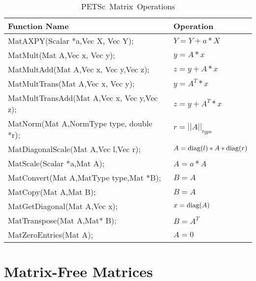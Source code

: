 \begin{table}[H]
\begin{center}
\begin{tabular}{ll}
{\bf Function Name} & {\bf Operation} \\
\hline
MatAXPY(Scalar *a,Vec X, Vec Y); & $ Y = Y + a*X $ \\
MatMult(Mat A,Vec x, Vec y); & $ y = A*x $ \\
MatMultAdd(Mat A,Vec x, Vec y,Vec z); & $ z = y + A*x $ \\
MatMultTrans(Mat A,Vec x, Vec y); & $ y = A^{T}*x $ \\
MatMultTransAdd(Mat A,Vec x, Vec y,Vec z); & $ z = y + A^{T}*x $ \\
MatNorm(Mat A,NormType type,  double *r); & $ r = ||A||_{type}$ \\
MatDiagonalScale(Mat A,Vec l,Vec r); & $ A = \hbox{diag}(l)*A*\hbox{diag}(r) $ \\
MatScale(Scalar *a,Mat A); & $ A = a*A $ \\
MatConvert(Mat A,MatType type,Mat *B); & $ B = A $ \\
MatCopy(Mat A,Mat B); &  $ B = A $ \\
MatGetDiagonal(Mat A,Vec x); & $ x = \hbox{diag}(A)$ \\
MatTranspose(Mat A,Mat* B); & $ B = A^{T} $ \\
MatZeroEntries(Mat A); & $ A = 0 $ \\
\hline 
\end{tabular}
\end{center}
\caption{\hbox{PETSc Matrix Operations}}
\label{fig:matrixops}
\end{table}

\section{Matrix-Free Matrices} 

